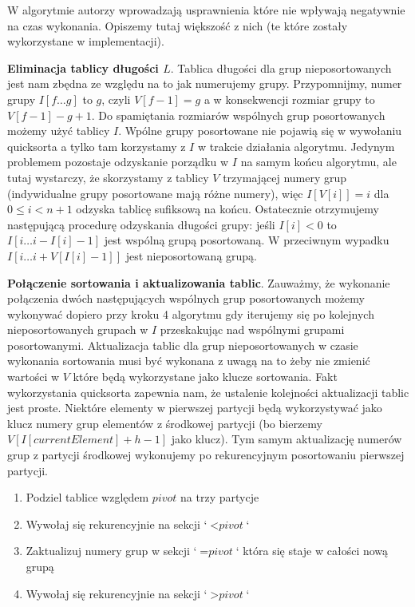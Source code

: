 \documentclass[12pt]{article}
\begin{document}
W algorytmie autorzy wprowadzają usprawnienia które nie wpływają negatywnie na czas wykonania. Opiszemy tutaj większość z nich (te które zostały wykorzystane w implementacji).

\textbf{Eliminacja tablicy długości $L$}. Tablica długości dla grup nieposortowanych jest nam zbędna ze względu na to jak numerujemy grupy. Przypomnijmy, numer grupy $I[f \ldots g]$ to $g$, czyli $V[f-1] = g$ a w konsekwencji rozmiar grupy to $V[f-1] - g + 1$. Do spamiętania rozmiarów wspólnych grup posortowanych możemy użyć tablicy $I$. Wpólne grupy posortowane nie pojawią się w wywołaniu quicksorta a tylko tam korzystamy z $I$ w trakcie działania algorytmu. Jedynym problemem pozostaje odzyskanie porządku w $I$ na samym końcu algorytmu, ale tutaj wystarczy, że skorzystamy z tablicy $V$ trzymającej numery grup (indywidualne grupy posortowane mają różne numery), więc $I[V[i]] = i$ dla $0 \leq i < n+1$ odzyska tablicę sufiksową na końcu. Ostatecznie otrzymujemy następującą procedurę odzyskania długości grupy: jeśli $I[i] < 0$ to $I[i \ldots i - I[i] - 1]$ jest wspólną grupą posortowaną. W przeciwnym wypadku $I[i \ldots i + V[I[i]-1]]$ jest nieposortowaną grupą. 

\textbf{Połączenie sortowania i aktualizowania tablic}. Zauważmy, że wykonanie połączenia dwóch następujących wspólnych grup posortowanych możemy wykonywać dopiero przy kroku 4 algorytmu gdy iterujemy się po kolejnych nieposortowanych grupach w $I$ przeskakując nad wspólnymi grupami posortowanymi. Aktualizacja tablic dla grup nieposortowanych w czasie wykonania sortowania musi być wykonana z uwagą na to żeby nie zmienić wartości w $V$ które będą wykorzystane jako klucze sortowania. Fakt wykorzystania quicksorta zapewnia nam, że ustalenie kolejności aktualizacji tablic jest proste. Niektóre elementy w pierwszej partycji będą wykorzystywać jako klucz numery grup elementów z środkowej partycji (bo bierzemy $V[I[currentElement] + h - 1]$ jako klucz). Tym samym aktualizację numerów grup z partycji środkowej wykonujemy po rekurencyjnym posortowaniu pierwszej partycji.
\begin{enumerate}
    \item Podziel tablice względem $pivot$ na trzy partycje
    \item Wywołaj się rekurencyjnie na sekcji `$< \textit{pivot}$`
    \item Zaktualizuj numery grup w sekcji `$= \textit{pivot}$` która się staje w całości nową grupą
    \item Wywołaj się rekurencyjnie na sekcji `$> \textit{pivot}$`
\end{enumerate}
\medskip

\printbibliography[title={Bibliografia}]
\end{document}

